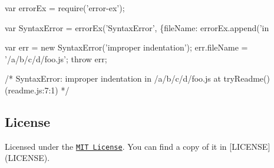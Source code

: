 \begin{DoxyCode}
var errorEx = require('error-ex');

var SyntaxError = errorEx('SyntaxError', \{fileName: errorEx.append('in %

var err = new SyntaxError('improper indentation');
err.fileName = '/a/b/c/d/foo.js';
throw err;

/*
    SyntaxError: improper indentation in /a/b/c/d/foo.js
        at tryReadme() (readme.js:7:1)
*/
\end{DoxyCode}


\subsection*{License}

Licensed under the \href{http://opensource.org/licenses/MIT}{\tt M\+IT License}. You can find a copy of it in \mbox{[}L\+I\+C\+E\+N\+SE\mbox{]}(L\+I\+C\+E\+N\+SE). 